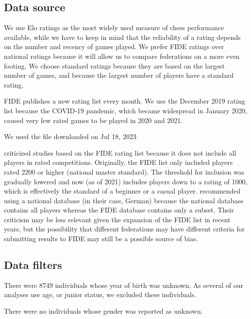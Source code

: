 \documentclass[9pt,twocolumn,twoside,lineno]{pnas-new}
\begin{document}
\subsection*{Data source}
We use Elo ratings as the most  widely used measure of chess performance available, while we have to keep in mind that the reliability of a rating depends on the number and recency of games played.
We prefer FIDE ratings over national ratings because it will allow us to compare federations on a more even footing. We choose standard ratings because they are based on the largest number of games, and because the largest number of players have a standard rating.


FIDE publishes a new rating list every month. We use the December 2019 rating list because the COVID-19 pandemic, which became widespread in January 2020, caused very few rated games to be played in 2020 and 2021.

We used the file downloaded on Jul 18, 2023


\cite{vacigulabilalic} criticized studies based on the FIDE rating list because it does not include all players in rated competitions. Originally, the FIDE list only included players rated 2200 or higher (national master standard). The threshold for inclusion was gradually lowered and now (as of 2021)  includes players down to a rating of 1000, which is effectively the standard of a beginner or a  casual player. \cite{vacigulabilalic} recommended using a national database (in their case, German) because the national database contains all players whereas the FIDE database contains only a subset. Their criticism may be less relevant given the expansion of the FIDE list in recent years, but the possibility that different federations may have different criteria for submitting results to FIDE may still be a possible source of bias.


\subsection*{Data filters}

There were 8749 individuals whose year of birth was unknown. As several of our analyses use age, or junior status, we excluded these individuals.

There were no individuals whose gender was reported as unknown.
\end{document}

